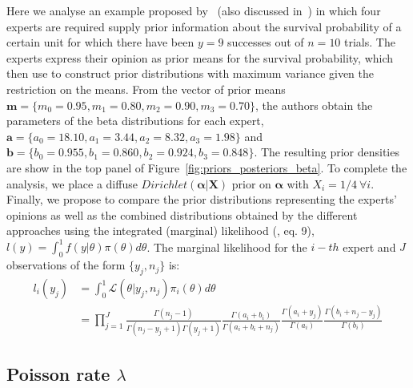 \documentclass[a4paper, notitlepage, 10pt]{article}
\begin{document}
Here we analyse an example proposed by~\cite{savchuk1994} (also discussed in~\cite{rufo2012B}) in which four experts are required supply prior information about the survival probability of a certain unit for which there have been $y = 9$ successes out of $n = 10$ trials.
The experts express their opinion as prior means for the survival probability, which~\cite{savchuk1994} then use to construct prior distributions with maximum variance given the restriction on the means.
From the vector of prior means $\mathbf{m} = \{ m_0 = 0.95, m_1 = 0.80, m_2 = 0.90, m_3 = 0.70 \}$, the authors obtain the parameters of the beta distributions for each expert,  $\mathbf{a} = \{ a_0 = 18.10, a_1 = 3.44 , a_2 = 8.32, a_3 = 1.98 \}$ and  $\mathbf{b} = \{ b_0 = 0.955 , b_1 = 0.860, b_2 = 0.924, b_3 = 0.848\}$.
The resulting prior densities are show in the top panel of Figure~\ref{fig:priors_posteriors_beta}.
To complete the analysis, we place a diffuse $Dirichlet(\boldsymbol\alpha | \boldsymbol X)$ prior on $\boldsymbol\alpha$ with $X_i = 1/4 \: \forall i$.
Finally, we propose to compare the prior distributions representing the experts' opinions as well as the combined distributions obtained by the different approaches using the integrated (marginal) likelihood (\cite{raftery2007}, eq. 9), $l(y) = \int_{0}^{1}f(y|\theta)\pi(\theta)d\theta$.
The marginal likelihood for the $i-th$ expert and $J$ observations of the form $\{ y_j, n_j\}$ is:
\begin{align}
  \label{eq:marglike}
l_i(y_j) &= \int_{0}^{1}\mathcal{L}(\theta|y_j, n_j)\pi_i(\theta)d\theta\nonumber\\
 &= \prod_{j = 1}^{J}\frac{\Gamma(n_j-1)}{\Gamma(n_j-y_j + 1)\Gamma(y_j+1)}\frac{\Gamma(a_i + b_i)}{\Gamma(a_i + b_i + n_j)}\frac{\Gamma(a_i + y_j)}{\Gamma(a_i)}\frac{\Gamma(b_i + n_j - y_j) }{\Gamma(b_i)}
 \end{align}
 
\subsection*{Poisson rate $\lambda$}
\label{sec:gamma}
\end{document}
